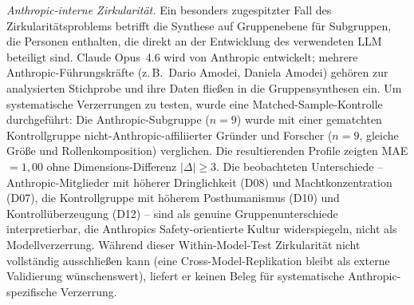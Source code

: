 \documentclass[12pt,a4paper]{article}
\begin{document}
\emph{Anthropic-interne Zirkularit\"at.} Ein besonders zugespitzter Fall des Zirkularit\"atsproblems betrifft die Synthese auf Gruppenebene f\"ur Subgruppen, die Personen enthalten, die direkt an der Entwicklung des verwendeten LLM beteiligt sind. Claude Opus~4.6 wird von Anthropic entwickelt; mehrere Anthropic-F\"uhrungskr\"afte (z.\,B.\ Dario Amodei, Daniela Amodei) geh\"oren zur analysierten Stichprobe und ihre Daten flie\ss{}en in die Gruppensynthesen ein. Um systematische Verzerrungen zu testen, wurde eine Matched-Sample-Kontrolle durchgef\"uhrt: Die Anthropic-Subgruppe ($n = 9$) wurde mit einer gematchten Kontrollgruppe nicht-Anthropic-affiliierter Gr\"under und Forscher ($n = 9$, gleiche Gr\"o\ss{}e und Rollenkomposition) verglichen. Die resultierenden Profile zeigten MAE $= 1{,}00$ ohne Dimensions-Differenz $|\Delta| \geq 3$. Die beobachteten Unterschiede -- Anthropic-Mitglieder mit h\"oherer Dringlichkeit (D08) und Machtkonzentration (D07), die Kontrollgruppe mit h\"oherem Posthumanismus (D10) und Kontroll\"uberzeugung (D12) -- sind als genuine Gruppenunterschiede interpretierbar, die Anthropics Safety-orientierte Kultur widerspiegeln, nicht als Modellverzerrung. W\"ahrend dieser Within-Model-Test Zirkularit\"at nicht vollst\"andig ausschlie\ss{}en kann (eine Cross-Model-Replikation bleibt als externe Validierung w\"unschenswert), liefert er keinen Beleg f\"ur systematische Anthropic-spezifische Verzerrung.
\end{document}
